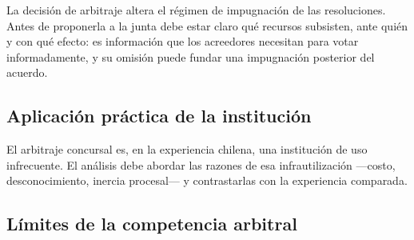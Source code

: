 \begin{practica}
La decisión de arbitraje altera el régimen de impugnación de las resoluciones. Antes de
proponerla a la junta debe estar claro qué recursos subsisten, ante quién y con qué
efecto: es información que los acreedores necesitan para votar informadamente, y su
omisión puede fundar una impugnación posterior del acuerdo.
\end{practica}

\bloqueJurisprudencial

\subsection{Aplicación práctica de la institución}

El arbitraje concursal es, en la experiencia chilena, una institución de uso
infrecuente. El análisis debe abordar las razones de esa infrautilización ---costo,
desconocimiento, inercia procesal--- y contrastarlas con la experiencia comparada.

\subsection{Límites de la competencia arbitral}

